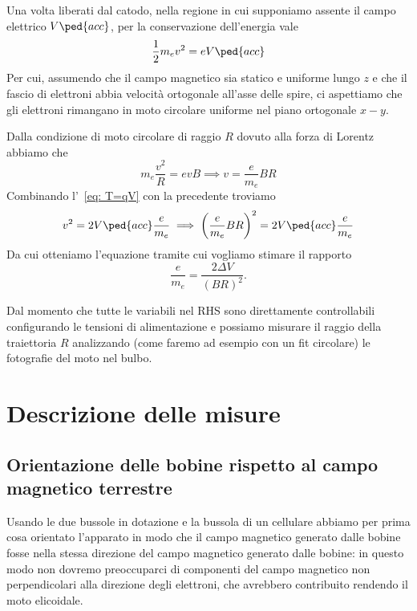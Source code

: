 \documentclass[10pt, a4paper, italian]{article}
\begin{document}
Una volta liberati dal catodo, nella regione in cui supponiamo assente il
campo elettrico $V\ped{acc}$, per la conservazione dell'energia vale
\begin{equation}\label{eq: T=qV}
    \frac{1}{2} m_{e} v^{2} = e V\ped{acc}
\end{equation}
Per cui, assumendo che il campo magnetico sia statico e uniforme lungo $z$ e
che il fascio di elettroni abbia velocità ortogonale all'asse delle spire,
ci aspettiamo che gli elettroni rimangano in moto circolare uniforme nel
piano ortogonale $x-y$.

Dalla condizione di moto circolare di raggio $R$ dovuto alla forza di Lorentz
abbiamo che
\[
m_{e} \frac{v^2}{R} = e v B \implies v = \frac{e}{m_e} B R
\]
Combinando l'~\cref{eq: T=qV} con la precedente troviamo
\[
v^2 = 2 V\ped{acc} \frac{e}{m_e} \implies \left(\frac{e}{m_e} B R\right)^2 =
2 V\ped{acc} \frac{e}{m_e}
\]
Da cui otteniamo l'equazione tramite cui vogliamo stimare il rapporto
\begin{equation}\label{eq: fit}
\frac{e}{m_{e}} = \frac{2 \Delta V}{(BR)^2}.
\end{equation}

Dal momento che tutte le variabili nel RHS sono direttamente controllabili
configurando le tensioni di alimentazione e possiamo misurare il raggio
della traiettoria $R$ analizzando (come faremo ad esempio con un fit
circolare) le fotografie del moto nel bulbo.

\section{Descrizione delle misure}
\subsection{Orientazione delle bobine rispetto al campo magnetico terrestre}
Usando le due bussole in dotazione e la bussola di un cellulare abbiamo per
prima cosa orientato l'apparato in modo che il campo magnetico generato dalle
bobine fosse nella stessa direzione del campo magnetico generato dalle bobine: in questo modo non dovremo preoccuparci di componenti del campo magnetico non perpendicolari alla direzione degli elettroni, che avrebbero contribuito rendendo il moto elicoidale.
\end{document}
